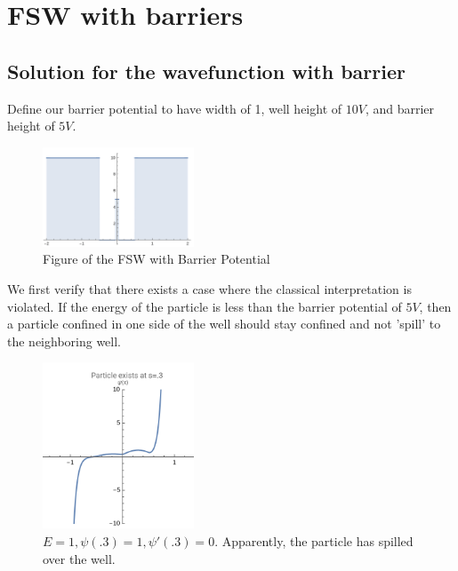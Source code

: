 \documentclass{article}
\numberwithin{equation}{section}
\begin{document}
\section{FSW with barriers}
\subsection{Solution for the wavefunction with barrier}
Define our barrier potential to have width of 1, well 
height of $10V$, and barrier height of $5V$. 
\begin{figure}[h]
    \centering
    \includegraphics[width=0.4\textwidth]{III2_barrier.png} %
    \caption{Figure of the FSW with Barrier Potential}
    \label{fig:III_barrief}
\end{figure}

We first verify that there exists a case where 
the classical interpretation is violated. If 
the energy of the particle is less than the barrier potential 
of $5V$, then a particle confined in one side of the well 
should stay confined and not 'spill' to the neighboring well. 

\begin{figure}[h]
    \centering
    \includegraphics[width=0.4\textwidth]{III2_spill.png} %
    \caption{$E = 1, \psi(.3) = 1, \psi'(.3) = 0$. Apparently, the particle 
    has spilled over the well.}
    \label{fig:III_spill}
\end{figure}
\end{document}
